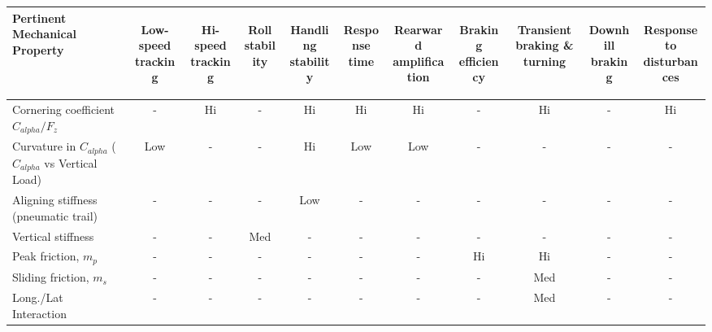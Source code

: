 \begin{table}[H]
	\centering\footnotesize
	\begin{threeparttable}
	
        \begin{tabulary}{\textwidth}{lcccccccccc}
            \toprule
            \textbf{Pertinent Mechanical Property} & \begin{sideways}\textbf{Low-speed tracking}\end{sideways} & \begin{sideways}\textbf{Hi-speed tracking}\end{sideways} & \begin{sideways}\textbf{Roll stability}\end{sideways} & \begin{sideways}\textbf{Handling stability}\end{sideways} & \begin{sideways}\textbf{Response time}\end{sideways} & \begin{sideways}\textbf{Rearward amplification}\end{sideways} & \begin{sideways}\textbf{Braking efficiency}\end{sideways} & \begin{sideways}\textbf{Transient braking \& turning}\end{sideways} & \begin{sideways}\textbf{Downhill braking}\end{sideways} & \begin{sideways}\textbf{Response to disturbances}\end{sideways} \\\midrule
            Cornering coefficient $C_{alpha}/F_z$ & -     & Hi    & -     & Hi    & Hi    & Hi    & -     & Hi    & -     & Hi \\
            Curvature in $C_{alpha}$ ($C_{alpha}$ vs Vertical Load) & Low   & -     & -     & Hi    & Low   & Low   & -     & -     & -     & - \\
            Aligning stiffness (pneumatic trail) & -     & -     & -     & Low   & -     & -     & -     & -     & -     & - \\
            Vertical stiffness & -     & -     & Med   & -     & -     & -     & -     & -     & -     & - \\
            Peak friction, $m_p$ & -     & -     & -     & -     & -     & -     & Hi    & Hi    & -     & - \\
            Sliding friction, $m_s$ & -     & -     & -     & -     & -     & -     & -     & Med   & -     & - \\
            Long./Lat Interaction & -     & -     & -     & -     & -     & -     & -     & Med   & -     & - \\
            \bottomrule
		\end{tabulary}


\end{threeparttable}
\end{table}
